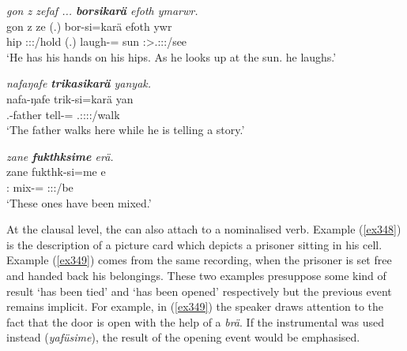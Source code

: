 \begin{exe}
	\ex \emph{gon z zefaf ... \textbf{borsikarä} efoth ymarwr.}\\
	\gll gon z ze (.) bor-si=karä efoth ywr\\
	hip \Iam{} \Fsg:\Sbj:\Rpst:\Pfv/hold (.) laugh-\Nmlz=\Prop{} sun \Stsg:\Sbj>\Tsg.\Masc:\Obj:\Nonpast:\Ipfv/see\\ 
	\trans `He has his hands on his hips. As he looks up at the sun. he laughs.'\\
	\label{ex350}
\end{exe}
\begin{exe}
	\ex \emph{nafaŋafe \textbf{trikasikarä} yanyak.}\\
	\gll nafa-ŋafe trik-si=karä yan\\
	\Third.\Poss-father tell-\Nmlz=\Prop{} \Tsg.\Masc:\Sbj:\Nonpast:\Ipfv:\Venit/walk\\
	\trans `The father walks here while he is telling a story.'
	\label{ex428}
\end{exe}
\begin{exe}
	\ex \emph{zane \textbf{fukthksime} erä.}\\
	\gll zane fukthk-si=me e\\
	\Dem:\Prox{} mix-\Nmlz=\Ins{} \Stpl:\Sbj:\Nonpast:\Ipfv/be\\
	\trans `These ones have been mixed.'
	\label{ex427}
\end{exe}

At the clausal level, the  can also attach to a nominalised verb. Example (\ref{ex348}) is the description of a picture card which depicts a prisoner sitting in his cell. Example (\ref{ex349}) comes from the same recording, when the prisoner is set free and handed back his belongings. These two examples presuppose some kind of result \textendash{} `has been tied' and `has been opened' respectively \textendash{} but the previous event remains implicit. For example, in (\ref{ex349}) the speaker draws attention to the fact that the door is open with the help of a   \emph{brä}. If the instrumental  was used instead (\emph{yafüsime}), the result of the opening event would be emphasised.

